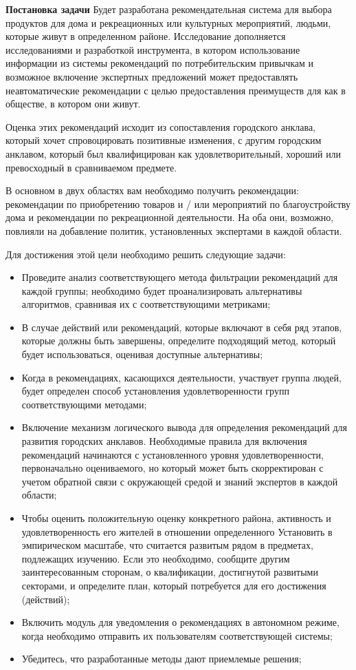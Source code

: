\textbf{Постановка задачи} Будет разработана рекомендательная система  для выбора продуктов для дома и рекреационных или культурных мероприятий, людьми, которые живут в определенном районе.  Исследование дополняется исследованиями и разработкой инструмента, в котором использование информации из системы рекомендаций по потребительским привычкам и возможное включение экспертных предложений может предоставлять неавтоматические рекомендации с целью предоставления преимуществ для как в обществе, в котором они живут.

Оценка этих рекомендаций исходит из сопоставления городского анклава, который хочет спровоцировать позитивные изменения, с другим городским анклавом, который был квалифицирован как удовлетворительный, хороший или превосходный в сравниваемом предмете.

В основном в двух областях вам необходимо получить рекомендации: рекомендации по приобретению товаров и / или мероприятий по благоустройству дома и рекомендации по рекреационной деятельности. На оба они, возможно, повлияли на добавление политик, установленных экспертами в каждой области.


Для достижения этой цели необходимо решить следующие задачи:


\begin{itemize}
\item Проведите анализ соответствующего метода фильтрации рекомендаций для каждой группы; необходимо будет проанализировать альтернативы алгоритмов, сравнивая их с соответствующими метриками;
\item В случае действий или рекомендаций, которые включают в себя ряд этапов, которые должны быть завершены, определите подходящий метод, который будет использоваться, оценивая доступные альтернативы;
\item Когда в рекомендациях, касающихся деятельности, участвует группа людей, будет определен способ установления удовлетворенности групп соответствующими методами;
\item Включение механизм логического вывода для определения рекомендаций для развития городских анклавов. Необходимые правила для включения рекомендаций начинаются с установленного уровня удовлетворенности, первоначально оцениваемого, но который может быть скорректирован с учетом обратной связи с окружающей средой и знаний экспертов в каждой области;
\item Чтобы оценить положительную оценку конкретного района, активность и удовлетворенность его жителей в отношении определенного Установить в эмпирическом масштабе, что считается развитым рядом в предметах, подлежащих изучению. Если это необходимо, сообщите другим заинтересованным сторонам, о квалификации, достигнутой развитыми секторами, и определите план, который потребуется для его достижения (действий);
\item Включить модуль для уведомления о рекомендациях в автономном режиме, когда необходимо отправить их пользователям соответствующей системы;
\item Убедитесь, что разработанные методы дают приемлемые решения;

\end{itemize}

